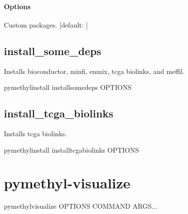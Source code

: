\documentclass[letterpaper,10pt,english]{sphinxmanual}
\begin{document}
\subsubsection*{Options}

\begin{fulllineitems}
\label{\detokenize{index:cmdoption-pymethyl-install-install-r-packages-p}}
Custom packages.  {[}default: {]}

\end{fulllineitems}



\section{install\_some\_deps}
\label{\detokenize{index:pymethyl-install-install-some-deps}}
Installs bioconductor, minfi, enmix, tcga biolinks, and meffil.

\begin{sphinxVerbatim}[commandchars=\\\{\}]
pymethyl\PYGZhy{}install install\PYGZus{}some\PYGZus{}deps \PYG{o}{[}OPTIONS\PYG{o}{]}
\end{sphinxVerbatim}


\section{install\_tcga\_biolinks}
\label{\detokenize{index:pymethyl-install-install-tcga-biolinks}}
Installs tcga biolinks.

\begin{sphinxVerbatim}[commandchars=\\\{\}]
pymethyl\PYGZhy{}install install\PYGZus{}tcga\PYGZus{}biolinks \PYG{o}{[}OPTIONS\PYG{o}{]}
\end{sphinxVerbatim}


\chapter{pymethyl-visualize}
\label{\detokenize{index:pymethyl-visualize}}
\begin{sphinxVerbatim}[commandchars=\\\{\}]
pymethyl\PYGZhy{}visualize \PYG{o}{[}OPTIONS\PYG{o}{]} COMMAND \PYG{o}{[}ARGS\PYG{o}{]}...
\end{sphinxVerbatim}
\end{document}
